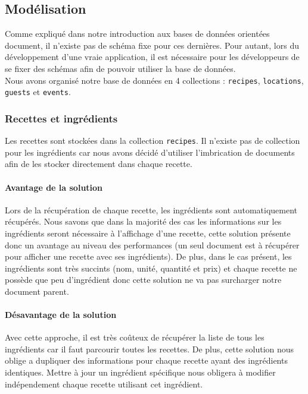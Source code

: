 \subsection{Modélisation} %
\label{sub:modelisation}

	Comme expliqué dans notre introduction aux bases de données orientées document, il n'existe pas de schéma fixe pour ces dernières. Pour autant, lors du développement d'une vraie application, il est nécessaire pour les développeurs de se fixer des schémas afin de pouvoir utiliser la base de données.\\

	Nous avons organisé notre base de données en 4 collections : \verb|recipes|, \verb|locations|, \verb|guests| et \verb|events|.

	\subsubsection{Recettes et ingrédients}

		Les recettes sont stockées dans la collection \verb|recipes|. Il n'existe pas de collection pour les ingrédients car nous avons décidé d'utiliser l'imbrication de documents afin de les stocker directement dans chaque recette.

		\paragraph{Avantage de la solution} %
		 \label{par:avantage_de_la_solution}
		 	Lors de la récupération de chaque recette, les ingrédients sont automatiquement récupérés. Nous savons que dans la majorité des cas les informations sur les ingrédients seront nécessaire à l'affichage d'une recette, cette solution présente donc un avantage au niveau des performances (un seul document est à récupérer pour afficher une recette avec ses ingrédients). De plus, dans le cas présent, les ingrédients sont très succints (nom, unité, quantité et prix) et chaque recette ne possède que peu d'ingrédient donc cette solution ne va pas surcharger notre document parent. 

		 \paragraph{Désavantage de la solution} %
		 \label{par:desavantage_de_la_solution}
		 	Avec cette approche, il est très coûteux de récupérer la liste de tous les ingrédients car il faut parcourir toutes les recettes. De plus, cette solution nous oblige a dupliquer des informations pour chaque recette ayant des ingrédients identiques. Mettre à jour un ingrédient spécifique nous obligera à modifier indépendement chaque recette utilisant cet ingrédient. 


